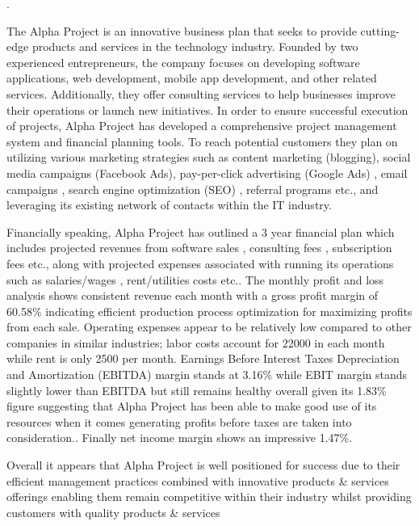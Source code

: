 .

The Alpha Project is an innovative business plan that seeks to provide cutting-edge products and services in the technology industry. Founded by two experienced entrepreneurs, the company focuses on developing software applications, web development, mobile app development, and other related services. Additionally, they offer consulting services to help businesses improve their operations or launch new initiatives. In order to ensure successful execution of projects, Alpha Project has developed a comprehensive project management system and financial planning tools. To reach potential customers they plan on utilizing various marketing strategies such as content marketing (blogging), social media campaigns (Facebook Ads), pay-per-click advertising (Google Ads) , email campaigns , search engine optimization (SEO) , referral programs etc., and leveraging its existing network of contacts within the IT industry. 

Financially speaking, Alpha Project has outlined a 3 year financial plan which includes projected revenues from software sales , consulting fees , subscription fees etc., along with projected expenses associated with running its operations such as salaries/wages , rent/utilities costs etc.. The monthly profit and loss analysis shows consistent revenue each month with a gross profit margin of 60.58\% indicating efficient production process optimization for maximizing profits from each sale. Operating expenses appear to be relatively low compared to other companies in similar industries; labor costs account for 22000 in each month while rent is only 2500 per month. Earnings Before Interest Taxes Depreciation and Amortization (EBITDA) margin stands at 3.16\% while EBIT margin stands slightly lower than EBITDA but still remains healthy overall given its 1.83\% figure suggesting that Alpha Project has been able to make good use of its resources when it comes generating profits before taxes are taken into consideration.. Finally net income margin shows an impressive 1.47\%. 

Overall it appears that Alpha Project is well positioned for success due to their efficient management practices combined with innovative products & services offerings enabling them remain competitive within their industry whilst providing customers with quality products & services